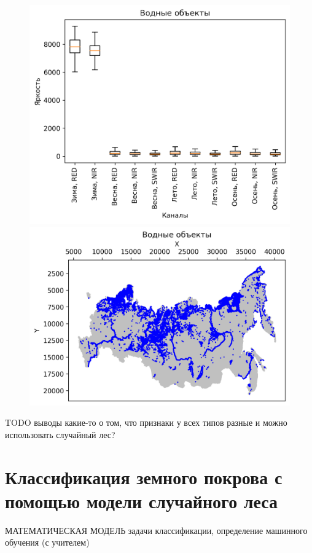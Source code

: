 \documentclass[14pt, a4paper, oneside]{extarticle}
\begin{document}
\begin{figure}[H]
    \centering
    \includegraphics[]{class-20-boxplot}
    \includegraphics[]{class-20-map}
\end{figure}

TODO выводы какие-то о том, что признаки у всех типов разные и можно использовать случайный лес?

\subsection{}
\newpage

\section{Классификация земного покрова с помощью модели случайного леса}
МАТЕМАТИЧЕСКАЯ МОДЕЛЬ задачи классификации, определение машинного обучения (с учителем)
\end{document}
